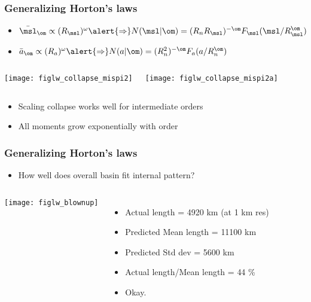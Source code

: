 
\begin{frame}[label=]
  \frametitle{Generalizing Horton's laws}

  \begin{itemize}
  \item<1->
    $\bar{\msl}_\om \propto (R_\msl)^\omega \alert{\Rightarrow}
    N(\msl|\om) = (R_nR_\msl)^{-\om} F_\msl(\msl / R_\msl^{\om}) $
  \item<2->
    $\bar{a}_\om \propto (R_a)^\omega \alert{\Rightarrow}
    N(a|\om) = (R_n^2)^{-\om} F_a(a / R_n^{\om}) $
  \end{itemize}
  \begin{columns}
    \begin{overprint}
      \texttt{[image: figlw\_collapse\_mispi2]}
    \end{overprint}
    \begin{overprint}
      \texttt{[image: figlw\_collapse\_mispi2a]}
    \end{overprint}
  \end{columns}

  \begin{itemize}
  \item<4-> Scaling collapse works well for intermediate orders
  \item<5-> All \alert{moments} grow exponentially with order
  \end{itemize}
  
\end{frame}

\begin{frame}[label=]
  \frametitle{Generalizing Horton's laws}

  \begin{itemize}
  \item How well does overall basin fit internal pattern?
  \end{itemize}
  \begin{columns}
    \texttt{[image: figlw\_blownup]}    
    \begin{itemize}
    \item<2->
      Actual length = \alert{4920 km} (at 1 km res)
    \item<3->
      Predicted Mean length = \alert{11100 km}
    \item<4->
      Predicted Std dev = \alert{5600 km}
    \item<5->
      Actual length/Mean length = \alert{44 \%}
    \item<6->
      Okay.
    \end{itemize}
  \end{columns}

\end{frame}

